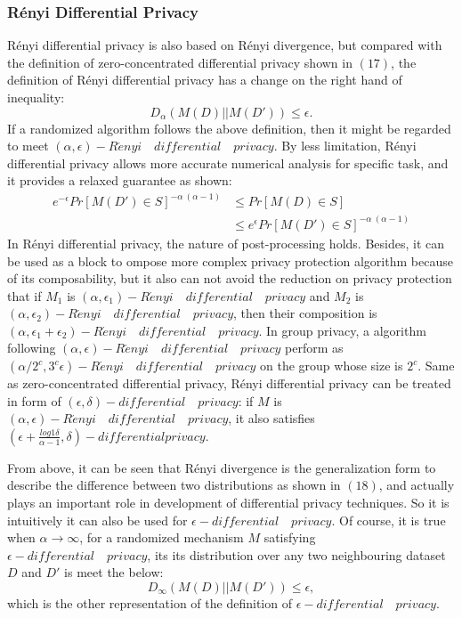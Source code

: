 \documentclass[conference]{IEEEtran}
\begin{document}
\subsubsection{Rényi Differential Privacy\cite{b31}}
Rényi differential privacy is also based on Rényi divergence, but compared with the definition of zero-concentrated differential privacy shown in $(17)$, the definition of Rényi differential privacy has a change on the right hand of inequality:
\begin{equation}
     D_{\alpha}(M(D)||M(D')) \leq \epsilon.
\end{equation}
If a randomized algorithm follows the above definition, then it might be regarded to meet $(\alpha, \epsilon)-R\acute{e}nyi \quad differential \quad privacy$. By less limitation, Rényi differential privacy allows more accurate numerical analysis for specific task, and it provides a relaxed guarantee as shown:
\begin{equation}
    \begin{split}
        e^{-\epsilon}Pr[M(D') \in S]^{-\alpha \ (\alpha - 1)} &\leq Pr[M(D) \in S]\\
        &\leq e^{\epsilon}Pr[M(D') \in S]^{-\alpha \ (\alpha - 1)}
    \end{split}
\end{equation}
In Rényi differential privacy, the nature of post-processing holds. Besides, it can be used as a block to ompose more complex privacy protection algorithm because of its composability, but it also can not avoid the reduction on privacy protection that if $M_1$ is $(\alpha, \epsilon_1)-R\acute{e}nyi \quad differential \quad privacy$ and $M_2$ is $(\alpha, \epsilon_2)-R\acute{e}nyi \quad differential \quad privacy$, then their composition is $(\alpha, \epsilon_1 + \epsilon_2)-R\acute{e}nyi \quad differential \quad privacy$. In group privacy, a algorithm following $(\alpha, \epsilon)-R\acute{e}nyi \quad differential \quad privacy$ perform as $(\alpha / 2^c, 3^c \epsilon)-R\acute{e}nyi \quad differential \quad privacy$ on the group whose size is $2^c$. Same as zero-concentrated differential privacy, Rényi differential privacy can be treated in form of $(\epsilon, \delta)-differential \quad privacy$: if $M$ is $(\alpha, \epsilon)-R\acute{e}nyi \quad differential \quad privacy$, it also satisfies $(\epsilon + \frac{log 1 \delta}{\alpha - 1}, \delta)-differential privacy$.

From above, it can be seen that Rényi divergence is the generalization form to describe the difference between two distributions as shown in $(18)$, and actually plays an important role in development of differential privacy techniques. So it is intuitively it can also be used for $\epsilon-differential \quad privacy$. Of course, it is true when $\alpha \longrightarrow \infty$, for a randomized mechanism $M$ satisfying $\epsilon-differential \quad privacy$, its its distribution over any two neighbouring dataset $D$ and $D'$ is meet the below:
\begin{equation}
    D_{\infty}(M(D)||M(D')) \leq \epsilon,
\end{equation}
which is the other representation of the definition of $\epsilon-differential \quad privacy$. 
\end{document}
